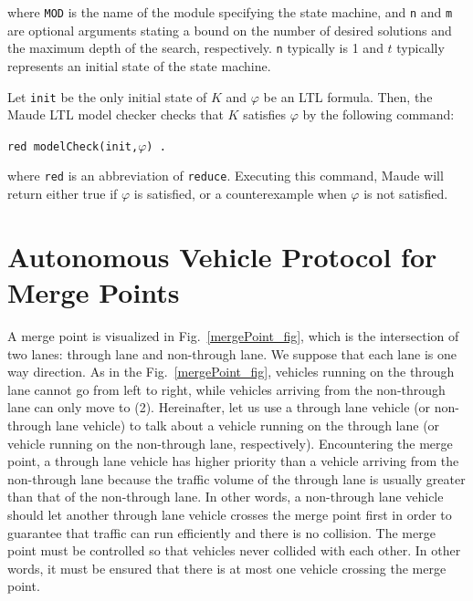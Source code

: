 \documentclass[10pt, conference, compsocconf]{IEEEtran}
\begin{document}
\noindent
where \verb!MOD! is the name of the module specifying the state
machine, and \verb!n! and \verb!m! are optional arguments stating a
bound on the number of desired solutions and the maximum depth of the
search, respectively.  \verb!n! typically is 1 and $t$ typically
represents an initial state of the state machine.

 Let \verb!init! be the only initial state of $K$ and $\varphi$ be an LTL
 formula. Then, the Maude LTL model checker checks that
 $K$ satisfies $\varphi$ by the following command:
 
 \smallskip
 \begin{small}
 	\noindent
 	\verb!red modelCheck(init,!$\varphi$\verb!) .!
 \end{small}
 \smallskip
 
 \noindent
 where \verb!red! is an abbreviation of \verb!reduce!. 
 Executing this command, Maude will return either true if $\varphi$ is satisfied, or a counterexample when $\varphi$ is not satisfied.


 
\section{Autonomous Vehicle Protocol for Merge Points}
 \label{sect_oriproto}
A merge point is visualized in Fig.~\ref{mergePoint_fig}, which is the intersection of two lanes: through lane and non-through lane.
We suppose that each lane is one way direction.
As in the Fig.~\ref{mergePoint_fig}, vehicles running on the through lane cannot go from left to right, while vehicles arriving from the non-through lane can only move to (2).
Hereinafter, let us use a through lane vehicle (or non-through lane vehicle) to talk about a vehicle running on the through lane (or vehicle running on the non-through lane, respectively). 
Encountering the merge point, a through lane vehicle has higher priority than a vehicle arriving from the non-through lane because the traffic volume of the through lane is usually greater than that of the non-through lane. 
In other words, a non-through lane vehicle should let another through lane vehicle crosses the merge point first in order to guarantee that traffic can run efficiently and there is no collision.
The merge point must be controlled so that vehicles never collided with each other. 
In other words, it must be ensured that there is at most one vehicle crossing the merge point.
\end{document}

